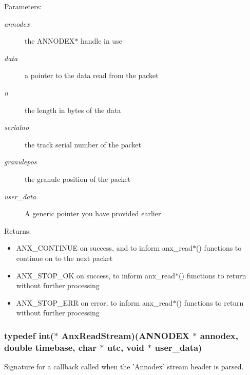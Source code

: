 \begin{Desc}
\item[Parameters:]
\begin{description}
\item[{\em annodex}]the ANNODEX$\ast$ handle in use \item[{\em data}]a pointer to the data read from the packet \item[{\em n}]the length in bytes of the data \item[{\em serialno}]the track serial number of the packet \item[{\em granulepos}]the granule position of the packet \item[{\em user\_\-data}]A generic pointer you have provided earlier \end{description}
\end{Desc}
\begin{Desc}
\item[Returns:]\begin{itemize}
\item ANX\_\-CONTINUE on success, and to inform anx\_\-read$\ast$() functions to continue on to the next packet\item ANX\_\-STOP\_\-OK on success, to inform anx\_\-read$\ast$() functions to return without further processing\item ANX\_\-STOP\_\-ERR on error, to inform anx\_\-read$\ast$() functions to return without further processing \end{itemize}
\end{Desc}
\subsubsection{\setlength{\rightskip}{0pt plus 5cm}typedef int($\ast$ {\bf Anx\-Read\-Stream})({\bf ANNODEX} $\ast$ annodex, double timebase, char $\ast$ utc, void $\ast$ user\_\-data)}\label{anx__read_8h_a0}


Signature for a callback called when the 'Annodex' stream header is parsed. 

